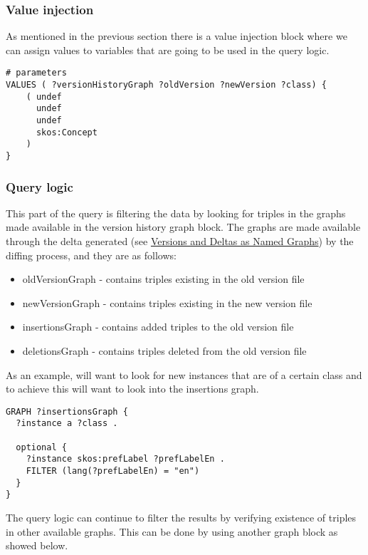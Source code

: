 \subsubsection{Value injection}
As mentioned in the previous section there is a value injection block where we can assign values to variables that are going to be used in the query logic.

\begin{lstlisting}
# parameters
VALUES ( ?versionHistoryGraph ?oldVersion ?newVersion ?class) {
    ( undef 
      undef 
      undef  
      skos:Concept 
    )
}
\end{lstlisting}

\subsubsection{Query logic}
This part of the query is filtering the data by looking for triples in the graphs made available in the version history graph block. The graphs are made available through the delta generated (see \hyperlink{https://github.com/jneubert/skos-history/wiki/Versions-and-Deltas-as-Named-Graphs}{Versions and Deltas as Named Graphs}) by the diffing process, and they are as follows:

\begin{itemize}
  \item oldVersionGraph - contains triples existing in the old version file
  \item newVersionGraph - contains triples existing in the new version file
  \item insertionsGraph - contains added triples to the old version file
  \item deletionsGraph - contains triples deleted from the old version file
\end{itemize}

As an example, will want to look for new instances that are of a certain class and to achieve this will want to look into the insertions graph.

\begin{lstlisting}
GRAPH ?insertionsGraph {
  ?instance a ?class .

  optional {
    ?instance skos:prefLabel ?prefLabelEn .
    FILTER (lang(?prefLabelEn) = "en")
  }
}
\end{lstlisting}

The query logic can continue to filter the results by verifying existence of triples in other available graphs. This can be done by using another graph block as showed below.

